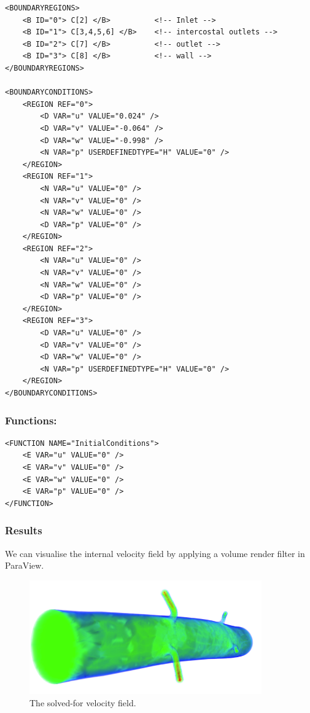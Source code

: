 \begin{lstlisting}[style=XMLStyle]
<BOUNDARYREGIONS>
    <B ID="0"> C[2] </B>          <!-- Inlet -->
    <B ID="1"> C[3,4,5,6] </B>    <!-- intercostal outlets -->
    <B ID="2"> C[7] </B>          <!-- outlet -->
    <B ID="3"> C[8] </B>          <!-- wall -->
</BOUNDARYREGIONS>

<BOUNDARYCONDITIONS>
    <REGION REF="0">
        <D VAR="u" VALUE="0.024" />
        <D VAR="v" VALUE="-0.064" />
        <D VAR="w" VALUE="-0.998" />
        <N VAR="p" USERDEFINEDTYPE="H" VALUE="0" />
    </REGION>
    <REGION REF="1">
        <N VAR="u" VALUE="0" />
        <N VAR="v" VALUE="0" />
        <N VAR="w" VALUE="0" />
        <D VAR="p" VALUE="0" />
    </REGION>
    <REGION REF="2">
        <N VAR="u" VALUE="0" />
        <N VAR="v" VALUE="0" />
        <N VAR="w" VALUE="0" />
        <D VAR="p" VALUE="0" />
    </REGION>
    <REGION REF="3">
        <D VAR="u" VALUE="0" />
        <D VAR="v" VALUE="0" />
        <D VAR="w" VALUE="0" />
        <N VAR="p" USERDEFINEDTYPE="H" VALUE="0" />
    </REGION>
</BOUNDARYCONDITIONS>
\end{lstlisting}

\subsubsection{Functions:~}
\begin{lstlisting}[style=XMLStyle]
<FUNCTION NAME="InitialConditions">
    <E VAR="u" VALUE="0" />
    <E VAR="v" VALUE="0" />
    <E VAR="w" VALUE="0" />
    <E VAR="p" VALUE="0" />
</FUNCTION>
\end{lstlisting}

\subsubsection{Results}
We can visualise the internal velocity field by applying a volume render filter in ParaView.

\begin{figure}
\begin{center}
\includegraphics[width=10cm]{img/velocityRendered.png}
\caption{The solved-for velocity field.}
\end{center}
\end{figure}

